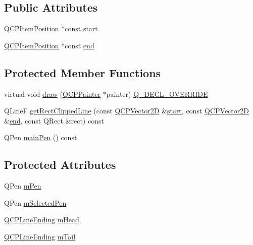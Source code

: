 \subsection*{Public Attributes}
\begin{DoxyCompactItemize}
\item 
\mbox{\hyperlink{class_q_c_p_item_position}{Q\+C\+P\+Item\+Position}} $\ast$const \mbox{\hyperlink{class_q_c_p_item_line_a602da607a09498b0f152ada1d6851bc5}{start}}
\item 
\mbox{\hyperlink{class_q_c_p_item_position}{Q\+C\+P\+Item\+Position}} $\ast$const \mbox{\hyperlink{class_q_c_p_item_line_a15598864c1c22a2497a1979c4980c4e1}{end}}
\end{DoxyCompactItemize}
\subsection*{Protected Member Functions}
\begin{DoxyCompactItemize}
\item 
virtual void \mbox{\hyperlink{class_q_c_p_item_line_ae184140b61b2ef5b8edde76304447200}{draw}} (\mbox{\hyperlink{class_q_c_p_painter}{Q\+C\+P\+Painter}} $\ast$painter) \mbox{\hyperlink{qcustomplot_8h_a42cc5eaeb25b85f8b52d2a4b94c56f55}{Q\+\_\+\+D\+E\+C\+L\+\_\+\+O\+V\+E\+R\+R\+I\+DE}}
\item 
Q\+LineF \mbox{\hyperlink{class_q_c_p_item_line_a7b00a1d82be8b961461cc4039acd12a3}{get\+Rect\+Clipped\+Line}} (const \mbox{\hyperlink{class_q_c_p_vector2_d}{Q\+C\+P\+Vector2D}} \&\mbox{\hyperlink{class_q_c_p_item_line_a602da607a09498b0f152ada1d6851bc5}{start}}, const \mbox{\hyperlink{class_q_c_p_vector2_d}{Q\+C\+P\+Vector2D}} \&\mbox{\hyperlink{class_q_c_p_item_line_a15598864c1c22a2497a1979c4980c4e1}{end}}, const Q\+Rect \&rect) const
\item 
Q\+Pen \mbox{\hyperlink{class_q_c_p_item_line_af8b5370462515b279578d8b4a57bd3b4}{main\+Pen}} () const
\end{DoxyCompactItemize}
\subsection*{Protected Attributes}
\begin{DoxyCompactItemize}
\item 
Q\+Pen \mbox{\hyperlink{class_q_c_p_item_line_abbb544d5bb927dfe4e81a7f3ca4c65ac}{m\+Pen}}
\item 
Q\+Pen \mbox{\hyperlink{class_q_c_p_item_line_aff858ad6dde3b90024814ca4b116f278}{m\+Selected\+Pen}}
\item 
\mbox{\hyperlink{class_q_c_p_line_ending}{Q\+C\+P\+Line\+Ending}} \mbox{\hyperlink{class_q_c_p_item_line_a51603f28ab7ddb1c1a95ea384791d3ed}{m\+Head}}
\item 
\mbox{\hyperlink{class_q_c_p_line_ending}{Q\+C\+P\+Line\+Ending}} \mbox{\hyperlink{class_q_c_p_item_line_ab8ed61dfe15bbb1cbf9b95eae95e242f}{m\+Tail}}
\end{DoxyCompactItemize}
